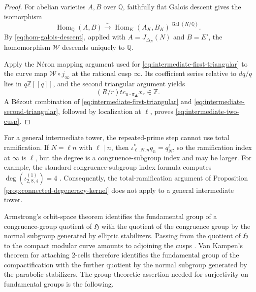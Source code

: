 \documentclass[12pt, letterpaper]{amsart}
\theoremstyle{definition}
\theoremstyle{remark}
\newcommand{\Q}{\mathbb Q}
\newcommand{\Z}{\mathbb Z}
\newcommand{\Hom}{\operatorname{Hom}}
\numberwithin{equation}{section}
\begin{document}
\begin{proof}
For abelian varieties \(A,B\) over
\(\Q\), faithfully flat Galois descent
\cite{SGA1} gives the isomorphism
\begin{equation}\label{eq:hom-galois-descent}
        \Hom_\Q(A,B)\xrightarrow{\sim}
        \Hom_K(A_K,B_K)^{\operatorname{Gal}(K/\Q)}.
\end{equation}
By \eqref{eq:hom-galois-descent}, applied with \(A=J_{\Delta_N}(N)\) and
\(B=E'\), the homomorphism \(\mathcal W\) descends uniquely to \(\Q\).

Apply the N\'eron mapping argument used for
\eqref{eq:intermediate-first-triangular} to the curve map
\(\mathcal W\circ j_\infty\) at the rational cusp \(\infty\). Its coefficient
series relative to \(dq/q\) lies in \(q\Z[[q]]\), and the second triangular
argument yields
\begin{equation}\label{eq:intermediate-second-triangular}
        (R/r)t c_{u\circ\pi_{\boldsymbol\Delta}}x_r\in\Z.
\end{equation}
A B\'ezout combination of \eqref{eq:intermediate-first-triangular} and
\eqref{eq:intermediate-second-triangular}, followed by localization at
\(\ell\), proves \eqref{eq:intermediate-two-cusp}.
\end{proof}

\pagebreak[3]
For a general intermediate tower, the repeated-prime step cannot use total
ramification.
If \(N=\ell n\) with \(\ell\mid n\), then
\(\iota_{\ell,N,n}^*q_n=q_N^\ell\), so
the ramification index at \(\infty\) is \(\ell\), but the degree is a
congruence-subgroup index and may be
larger. For example, the standard congruence-subgroup index formula computes
\(\deg(\iota^{(1)}_{2,8,4})=4\)
\cite{DiamondShurman}. Consequently, the total-ramification argument
of Proposition \ref{prop:connected-degeneracy-kernel} does not apply to a
general intermediate tower.


Armstrong's orbit-space theorem \cite{Armstrong} identifies the fundamental
group of a congruence-group quotient of \(\mathfrak H\) with the quotient of
the congruence group by the normal subgroup generated by elliptic stabilizers.
Passing from the quotient of \(\mathfrak H\) to the compact modular curve
amounts to adjoining the cusps
\cite{DiamondShurman}. Van Kampen's theorem for attaching
\(2\)-cells \cite{Hatcher} therefore identifies the
fundamental group of the compactification with the further quotient by the
normal subgroup generated by the parabolic stabilizers. The group-theoretic
assertion needed for surjectivity on fundamental groups is the following.
\end{document}
